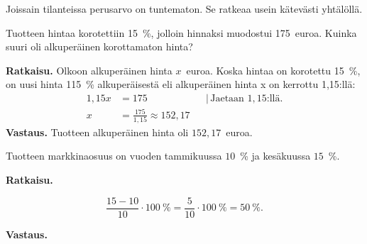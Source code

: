 Joissain tilanteissa perusarvo on tuntematon. Se ratkeaa usein kätevästi yhtälöllä.

\begin{esimerkki}
Tuotteen hintaa korotettiin 15~\%, jolloin hinnaksi muodostui 175~euroa. Kuinka suuri oli alkuperäinen korottamaton hinta?

\textbf{Ratkaisu.} 
Olkoon alkuperäinen hinta $x$~euroa. Koska hintaa on korotettu 15~\%, on uusi hinta 115~\% alkuperäisestä eli alkuperäinen hinta x on kerrottu 1,15:llä:
\begin{align*}
	1,15x	&= 175	&	&|\, \text{Jaetaan $1,15$:llä.} \\
	x	&= \frac{175}{1,15} \approx 152,17
\end{align*}
    \textbf{Vastaus.}
    Tuotteen alkuperäinen hinta oli $152,17$~euroa.
\end{esimerkki}


\begin{esimerkki}
    Tuotteen markkinaosuus on vuoden tammikuussa $10$~\% ja kesäkuussa $15$~\%.
    \begin{alakohdat}
    \end{alakohdat}
    
    \textbf{Ratkaisu.}
    
    \begin{alakohdat}
            \[
                \frac{15-10}{10} \cdot 100~\%= \frac{5}{10}\cdot 100~\% = 50~\%.
            \]
        
    \end{alakohdat}
    
    \textbf{Vastaus.}
    
    \begin{alakohdat}
    \end{alakohdat}
\end{esimerkki}
